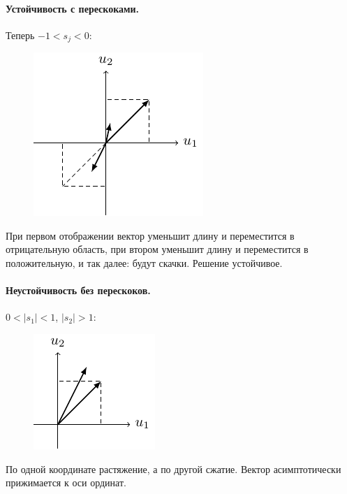\paragraph{Устойчивость с перескоками. } Теперь $-1<s_j<0$:
\begin{figure}[H]
	\centering
	\includegraphics[scale=1.5]{img/parametric_oscillations/sj_2}
\end{figure}

При первом отображении вектор уменьшит длину и переместится в отрицательную область, при втором уменьшит длину и переместится в положительную, и так далее: будут скачки. Решение устойчивое.

\paragraph{Неустойчивость без перескоков. } $0<|s_1|<1$, $|s_2|>1$:
\begin{figure}[H]
	\centering
	\includegraphics[scale=1.5]{img/parametric_oscillations/sj_3}   
\end{figure}

По одной координате растяжение, а по другой сжатие. Вектор асимптотически прижимается к оси ординат.

\newpage
